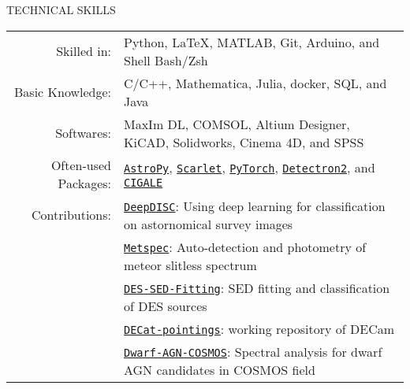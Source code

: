 \documentclass[10pt]{article} %
\begin{document}
\begin{section}{TECHNICAL SKILLS}

\begin{tabular}{rl}
    Skilled in: & Python, \LaTeX, MATLAB, Git, Arduino, and Shell Bash/Zsh \\
    Basic Knowledge: & C/C++, Mathematica, Julia, docker, SQL, and Java \\
    Softwares: & MaxIm DL, COMSOL, Altium Designer, KiCAD, Solidworks, Cinema 4D, and SPSS \\
    Often-used Packages: & \href{https://www.astropy.org/}{\texttt{AstroPy}}, \href{https://github.com/pmelchior/scarlet}{\texttt{Scarlet}}, \href{https://pytorch.org/}{\texttt{PyTorch}}, \href{https://github.com/facebookresearch/detectron2}{\texttt{Detectron2}}, and \href{https://cigale.lam.fr/}{\texttt{CIGALE}} \\
    Contributions: & \href{https://github.com/burke86/deepdisc}{\texttt{DeepDISC}}: Using deep learning for classification on astornomical survey images \\
    & \href{https://github.com/Chisen-Lupus/metspec}{\texttt{Metspec}}: Auto-detection and photometry of meteor slitless spectrum \\
    & \href{https://github.com/Chisen-Lupus/DES-SED-fitting}{\texttt{DES-SED-Fitting}}: SED fitting and classification of DES sources \\
    & \href{https://github.com/gnarayan/decat_pointings}{\texttt{DECat-pointings}}: working repository of DECam \\
    & \href{https://github.com/burke86/dwarf_agn_cosmos}{\texttt{Dwarf-AGN-COSMOS}}: Spectral analysis for dwarf AGN candidates in COSMOS field
\end{tabular}

\end{section} 
\end{document}
